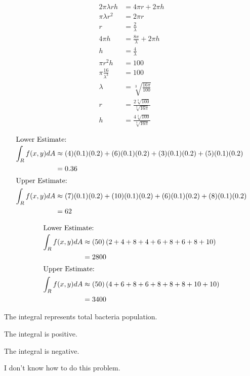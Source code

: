 \documentclass[8pt]{extarticle}
\begin{document}
\begin{problem}{15.3}
\begin{description}[font=\normalfont]
\begin{align*}
          2\pi\lambda r h &= 4\pi r + 2\pi h\\
          \pi\lambda r^2 &= 2\pi r\\
          r &= \frac{2}{\lambda}\\
          4\pi h &= \frac{8\pi}{\lambda} + 2\pi h\\
          h &= \frac{4}{\lambda}\\
          \pi r^2 h &= 100\\
          \pi \frac{16}{\lambda^3} &= 100\\
          \lambda &= \sqrt[3]{\frac{16\pi}{100}}\\
          r &= \frac{2\sqrt[3]{100}}{\sqrt[3]{16\pi}}\\
          h &= \frac{4\sqrt[3]{100}}{\sqrt[3]{16\pi}}
        \end{align*}
    \end{description}
  \end{problem}
  \begin{problem}{16.1}
    \begin{description}[font=\normalfont]
      \item[2:]
        \begin{align*}
          \shortintertext{Lower Estimate:}
          \int_{R}f(x,y) dA &\approx (4)(0.1)(0.2) + (6)(0.1)(0.2) + (3)(0.1)(0.2) + (5)(0.1)(0.2)\\
                            &= 0.36\\
          \shortintertext{Upper Estimate:}
          \int_{R}f(x,y) dA &\approx (7)(0.1)(0.2) + (10)(0.1)(0.2) + (6)(0.1)(0.2) + (8)(0.1)(0.2)\\
                            &= 62
        \end{align*}
      \item[4:]
        \begin{align*}
          \shortintertext{Lower Estimate:}
          \int_{R}f(x,y) dA &\approx (50)\left(2+4+8+4+6+8+6+8+10\right)\\
                            &= 2800\\
          \shortintertext{Upper Estimate:}
          \int_{R}f(x,y) dA &\approx (50)\left(4+6+8+6+8+8+8+10+10\right)\\
                            &= 3400
        \end{align*}
      \item[6:] The integral represents total bacteria population.
      \item[8:] The integral is positive.
      \item[14:] The integral is negative.
      \item[20:] I don't know how to do this problem.
    \end{description}
  \end{problem}
\end{document}
